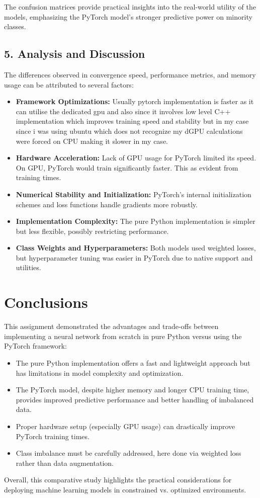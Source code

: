 \documentclass[12pt]{article}
\begin{document}
The confusion matrices provide practical insights into the real-world utility of the models, emphasizing the PyTorch model’s stronger predictive power on minority classes.

\subsection{5. Analysis and Discussion}
The differences observed in convergence speed, performance metrics, and memory usage can be attributed to several factors:

\begin{itemize}
    \item \textbf{Framework Optimizations:} Usually pytorch implementation is faster as it can utilise the dedicated gpu and also since it involves low level C++ implementation which improves training speed and stability but in my case since i was using ubuntu which does not recognize my dGPU calculations were forced on CPU making it slower in my case.
    \item \textbf{Hardware Acceleration:} Lack of GPU usage for PyTorch limited its speed. On GPU, PyTorch would train significantly faster. This as evident from training times.
    \item \textbf{Numerical Stability and Initialization:} PyTorch’s internal initialization schemes and loss functions handle gradients more robustly.
    \item \textbf{Implementation Complexity:} The pure Python implementation is simpler but less flexible, possibly restricting performance.
    \item \textbf{Class Weights and Hyperparameters:} Both models used weighted losses, but hyperparameter tuning was easier in PyTorch due to native support and utilities.
\end{itemize}

\newpage

\section*{Conclusions}

This assignment demonstrated the advantages and trade-offs between implementing a neural network from scratch in pure Python versus using the PyTorch framework:

\begin{itemize}
    \item The pure Python implementation offers a fast and lightweight approach but has limitations in model complexity and optimization.
    \item The PyTorch model, despite higher memory and longer CPU training time, provides improved predictive performance and better handling of imbalanced data.
    \item Proper hardware setup (especially GPU usage) can drastically improve PyTorch training times.
    \item Class imbalance must be carefully addressed, here done via weighted loss rather than data augmentation.
\end{itemize}

Overall, this comparative study highlights the practical considerations for deploying machine learning models in constrained vs. optimized environments.
\end{document}
